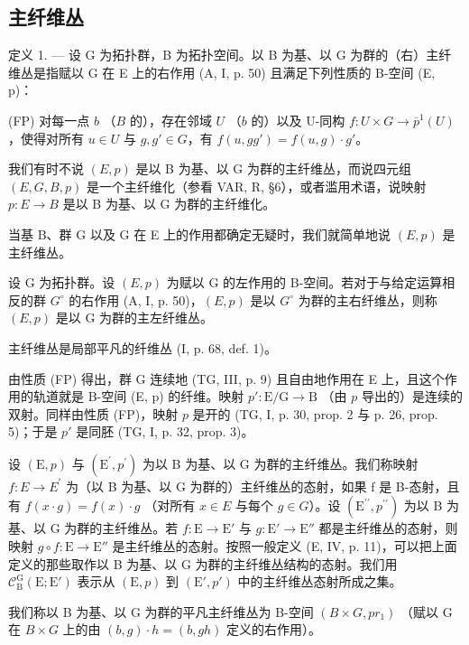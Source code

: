 \subsection{主纤维丛}

定义 1. --- 设 G 为拓扑群，B 为拓扑空间。以 B 为基、以 G 为群的（右）主纤维丛是指赋以 G 在 E 上的右作用 (A, I, p. 50) 且满足下列性质的 B-空间 (E, p)：

(FP) 对每一点 \(b\) （\(B\) 的），存在邻域 \(U\) （\(b\) 的）以及 U-同构 \(f\colon U\times G\to \overline{p}^{1}(U)\)，使得对所有 \(u\in U\) 与 \(g,g'\in G\)，有 \(f(u,gg')=f(u,g)\cdot g'\)。

我们有时不说 \((E, p)\) 是以 B 为基、以 G 为群的主纤维丛，而说四元组 \((E, G, B, p)\) 是一个主纤维化（参看 VAR, R, §6），或者滥用术语，说映射 \(p: E \to B\) 是以 B 为基、以 G 为群的主纤维化。

当基 B、群 G 以及 G 在 E 上的作用都确定无疑时，我们就简单地说 \((E, p)\) 是主纤维丛。

设 G 为拓扑群。设 \((E,p)\) 为赋以 G 的左作用的 B-空间。若对于与给定运算相反的群 \(G^{\circ}\) 的右作用 (A, I, p. 50)，\((E,p)\) 是以 \(G^{\circ}\) 为群的主右纤维丛，则称 \((E,p)\) 是以 G 为群的主左纤维丛。

主纤维丛是局部平凡的纤维丛 (I, p. 68, def. 1)。

由性质 (FP) 得出，群 G 连续地 (TG, III, p. 9) 且自由地作用在 E 上，且这个作用的轨道就是 B-空间 (E, p) 的纤维。映射 \(p' \colon \mathrm{E} / \mathrm{G} \to \mathrm{B}\) （由 \(p\) 导出的）是连续的双射。同样由性质 (FP)，映射 \(p\) 是开的 (TG, I, p. 30, prop. 2 与 p. 26, prop. 5)；于是 \(p'\) 是同胚 (TG, I, p. 32, prop. 3)。

设 \((\mathrm{E},p)\) 与 \((\mathrm{E}^{\prime},p^{\prime})\) 为以 B 为基、以 G 为群的主纤维丛。我们称映射 \(f: E \to E^{\prime}\) 为（以 B 为基、以 G 为群的）主纤维丛的态射，如果 f 是 B-态射，且有 \(f(x \cdot g) = f(x) \cdot g\) （对所有 \(x \in E\) 与每个 \(g \in G\)）。设 \((\mathrm{E}^{\prime\prime},p^{\prime\prime})\) 为以 B 为基、以 G 为群的主纤维丛。若 \(f: \mathrm{E} \to \mathrm{E}'\) 与 \(g: \mathrm{E}' \to \mathrm{E}''\) 都是主纤维丛的态射，则映射 \(g \circ f: \mathrm{E} \to \mathrm{E}''\) 是主纤维丛的态射。按照一般定义 (E, IV, p. 11)，可以把上面定义的那些取作以 B 为基、以 G 为群的主纤维丛结构的态射。我们用 \(\mathcal{C}_{\mathrm{B}}^{\mathrm{G}}(\mathrm{E}; \mathrm{E}')\) 表示从 \((\mathrm{E}, p)\) 到 \((\mathrm{E}',p')\) 中的主纤维丛态射所成之集。

我们称以 B 为基、以 G 为群的平凡主纤维丛为 B-空间 \((B \times G, pr_{1})\) （赋以 G 在 \(B \times G\) 上的由 \((b, g) \cdot h = (b, gh)\) 定义的右作用）。

